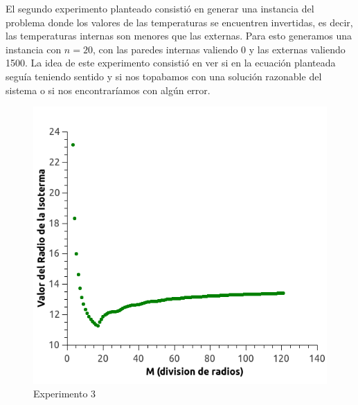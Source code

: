 El segundo experimento planteado consistió en generar una instancia del problema donde los valores de las temperaturas se encuentren invertidas, es decir, las temperaturas internas son menores que las externas. Para esto generamos una instancia con $n=20$, con las paredes internas valiendo 0 y las externas valiendo 1500. La idea de este experimento consistió en ver si en la ecuación planteada seguía teniendo sentido y si nos topabamos con una solución razonable del sistema o si nos encontraríamos con algún error.
\\
\begin{figure}
  \vspace{-20pt}
  \begin{center}
    \includegraphics[scale= 0.4]{imagenes/graphDiscretizacion.png}
  \end{center}
  \vspace{-20pt}
  \caption{Experimento 3}
  \vspace{-10pt}
  \label{fig:Exp3}
\end{figure}

